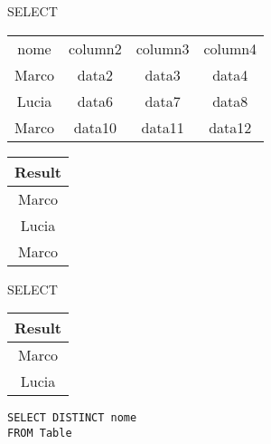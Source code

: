     \begin{frame}{SELECT}
    \begin{table}[h]
    \centering
    \begin{tabular}{|c|c|c|c|}
    \hline
    \rowcolor{cyan!30}\multicolumn{4}{|c|}{Table} \\
    \hline
    \rowcolor{cyan!30}nome &  column2 & column3 & column4 \\
    \hline
    \cellcolor{red!20}Marco &  data2 & data3 & data4 \\
    \cellcolor{red!20}Lucia &  data6 & data7 & data8 \\
    \cellcolor{red!20}Marco &  data10 & data11 & data12 \\
    \hline
    \end{tabular}
    \end{table}
    
    \vspace{2em}
    
    \begin{table}[h]
    \centering
    \begin{tabular}{|c|}
    \hline
    \rowcolor{cyan!30}Result \\
    \hline
    Marco \\
    Lucia \\
    Marco \\
    \hline
    \end{tabular}
    \end{table}
    \end{frame}
    \begin{frame}{SELECT}
    \begin{table}[h]
    \centering
    \begin{tabular}{|c|}
    \hline
    \rowcolor{cyan!30}Result \\
    \hline
    Marco \\
    Lucia \\
    \hline
    \end{tabular}
    \end{table}
    \vspace{2em}
    \texttt{SELECT DISTINCT nome \\FROM Table}
    \end{frame}
    
